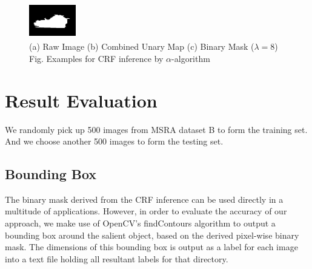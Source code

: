 \documentclass[10pt,twocolumn,letterpaper]{article}
\begin{document}
\begin{figure}
\begin{center}
    \includegraphics[width=0.8in,height=0.6in]{./Figures/CRFinference/5_162_162349_2.jpg} \\
    \footnotesize  (a) Raw Image (b) Combined Unary Map  (c) Binary Mask ($\lambda=8$)\\
     Fig. Examples for CRF inference by $\alpha$-algorithm
\end{center}
\end{figure}

\section{Result Evaluation}
We randomly pick up 500 images from MSRA dataset B to form the training set. And we choose another 500 images to form the testing set.

\subsection{Bounding Box}
The binary mask derived from the CRF inference can be used directly in a multitude of applications. However, in order to evaluate the accuracy of our approach, we make use of OpenCV's findContours algorithm to output a bounding box around the salient object, based on the derived pixel-wise binary mask. The dimensions of this bounding box is output as a label for each image into a text file holding all resultant labels for that directory.

\end{document}

